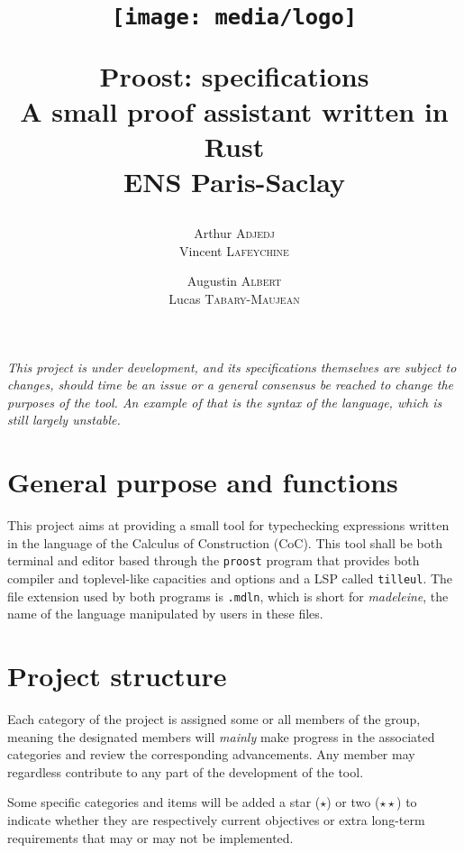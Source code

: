 \documentclass[twocolumn]{article}
\author{
  Arthur \textsc{Adjedj}\\
  Vincent \textsc{Lafeychine} \and
  Augustin \textsc{Albert} \\
  Lucas \textsc{Tabary-Maujean}
}
\title{
  \texttt{[image: media/logo]}

  \textbf{Proost: specifications}\\
  \large A small proof assistant written in Rust
  \\[1\baselineskip]\normalsize ENS Paris-Saclay
}
\newcommand{\etun}{{\color{Green} ($\star$)} }
\newcommand{\etde}{{\color{Orange} ($\star\star$)} }
\begin{document}
\thispagestyle{fancy}
\maketitle

\emph{
  This project is under development, and its specifications themselves are
  subject to changes, should time be an issue or a general consensus be reached
  to change the purposes of the tool. An example of that is the syntax of the
  language, which is still largely unstable. }

\section{General purpose and functions}
This project aims at providing a small tool for typechecking expressions written
in the language of the Calculus of Construction (CoC). This tool shall be both
terminal and editor based through the \texttt{proost} program that provides both
compiler and toplevel-like capacities and options and a LSP called
\texttt{tilleul}. The file extension used by both programs is \texttt{.mdln},
which is short for \emph{madeleine}, the name of the language manipulated by
users in these files.


\section{Project structure}
Each category of the project is assigned some or all members of the group,
meaning the designated members will \emph{mainly} make progress in the
associated categories and review the corresponding advancements. Any member may
regardless contribute to any part of the development of the tool.

Some specific categories and items will be added a star \etun or two \etde to
indicate whether they are respectively current objectives or extra long-term
requirements that may or may not be implemented.
\end{document}
